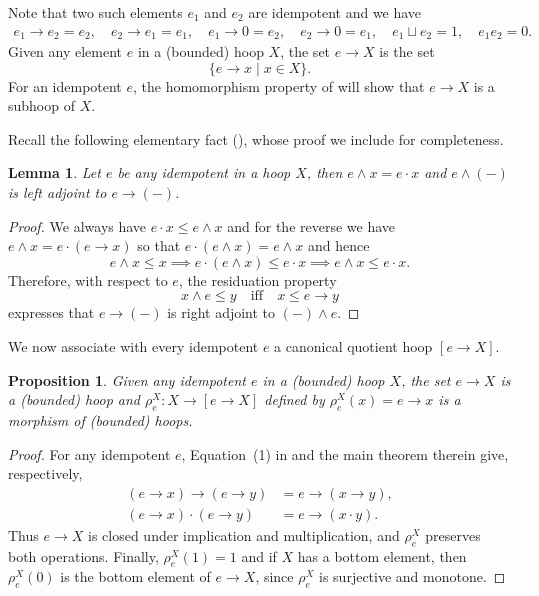 \documentclass[11pt]{article}
\theoremstyle{pretty}
\newtheorem{lemma}[theorem]{Lemma}
\newtheorem{proposition}[theorem]{Proposition}
\theoremstyle{plainnote}
\renewcommand{\2}{\mathbf{2}}
\begin{document}
Note that two such elements $e_1$ and $e_2$ are idempotent and we have 
\begin{align*}
 e_1 \to e_2 = e_2, \quad 
 e_2 \to e_1 = e_1,  \quad
 e_1 \to 0 = e_2, \quad
 e_2 \to 0 = e_1, \quad
 e_1 \sqcup e_2 = 1,  \quad
 e_1 e_2 = 0. 
\end{align*}
Given any element $e$ in a (bounded) hoop $X$, the set $e \to X$ is the set 
\[
\{e \to x \mid x \in X\}.
\] 
For an idempotent $e$, the homomorphism property of \cite{VeroffSpinks2004} will show that $e\to X$ is a subhoop of $X$.

Recall the following elementary fact (\cite[Equation~(61)]{VeroffSpinks2004}), whose proof we include for completeness.
\begin{lemma} \label{lemma: idempotent}
Let $e$ be any idempotent in a hoop $X$, then $e\wedge x = e\cdot x$ and $e \wedge (-)$ is left adjoint to $e \to (-)$.
\end{lemma}
\begin{proof}
We always have $e\cdot x\leqslant e \wedge x$ and for the reverse we have $e\wedge x = e\cdot (e\to x)$ so that $e\cdot (e\wedge x) = e \wedge x$ and hence 
\[
e \wedge x \leqslant x \implies e\cdot (e \wedge x) \leqslant e\cdot x \implies e \wedge x \leqslant e\cdot x.  
\]
Therefore, with respect to $e$, the residuation property 
\[
x \wedge e \leqslant y \quad \text{iff} \quad x \leqslant e \to y
\]
expresses that $e \to (-)$ is right adjoint to $(-) \wedge e$. 
\end{proof}

We now associate with every idempotent $e$ a canonical quotient hoop $[e\to X]$.
\begin{proposition}\label{prop:filter_is_hoop}
Given any idempotent $e$ in a (bounded) hoop $X$, the set $e \to X$ is a (bounded) hoop and $\rho^X_e:X \to [e \to X]$ defined by $\rho^X_e(x) = e\to x$ is a morphism of (bounded) hoops. 
\end{proposition}
\begin{proof}
For any idempotent $e$, Equation~(1) in \cite{VeroffSpinks2004} and  the main theorem therein give, respectively,
\begin{align*}
(e\to x)\to(e\to y)&=e\to(x\to y),\\
(e\to x)\cdot (e\to y)&=e\to(x\cdot y).
\end{align*}
Thus $e\to X$ is closed under implication and multiplication, and $\rho_e^X$ preserves both operations.
Finally, $\rho_e^X(1) = 1$ and if $X$ has a bottom element, then $\rho^X_e(0)$ is the bottom element of $e \to X$, since $\rho^X_e$ is surjective and monotone. 
\end{proof}
\end{document}
